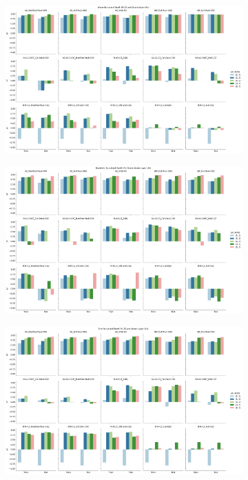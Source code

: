 \documentclass[journal=jacsat,manuscript=article]{achemso}
\begin{document}
\begin{figure}[H]
	\centering
	\begin{subfigure}[b]{\textwidth}
		\centering
		\includegraphics[width=\textwidth]{images/Function_Fitting/16qubit_Linear_RUD_AL.png}
		\caption{}
		\label{fig:16qubit_Linear_RUD_AL}
	\end{subfigure}
	\hfill
	\begin{subfigure}[b]{\textwidth}
		\centering
		\includegraphics[width=\textwidth]{images/Function_Fitting/16qubit_Quadratic_RUD_AL.png}
		\caption{}
		\label{fig:16qubit_Quadratic_RUD_AL}
	\end{subfigure}
	\hfill
	\begin{subfigure}[b]{\textwidth}
		\centering
		\includegraphics[width=\textwidth]{images/Function_Fitting/16qubit_Sine_RUD_AL.png}

\end{subfigure}
\end{figure}
\end{document}
